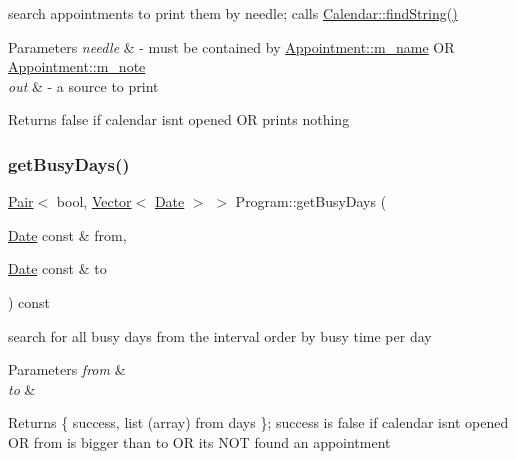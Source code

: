 search appointments to print them by needle; calls \hyperlink{classCalendar_accc025455e06e4031b9b76fe1a35220d}{Calendar\+::find\+String()} 
\begin{DoxyParams}{Parameters}
{\em needle} & -\/ must be contained by \hyperlink{classAppointment_aa3d8a2e3194a6b785b26f7c31a208462}{Appointment\+::m\+\_\+name} OR \hyperlink{classAppointment_a048a5e8081bcdccf2cffa725bcbe91b3}{Appointment\+::m\+\_\+note} \\
\hline
{\em out} & -\/ a source to print \\
\hline
\end{DoxyParams}
\begin{DoxyReturn}{Returns}
false if calendar isn\textquotesingle{}t opened OR prints nothing 
\end{DoxyReturn}
\mbox{\label{classProgram_af91512a81cffe079b6c300f47df906e8}} 
\subsubsection{\texorpdfstring{get\+Busy\+Days()}{getBusyDays()}}
{\footnotesize\ttfamily \hyperlink{structPair}{Pair}$<$ bool, \hyperlink{classVector}{Vector}$<$ \hyperlink{classDate}{Date} $>$ $>$ Program\+::get\+Busy\+Days (\begin{DoxyParamCaption}\item[{\hyperlink{classDate}{Date} const \&}]{from,  }\item[{\hyperlink{classDate}{Date} const \&}]{to }\end{DoxyParamCaption}) const}

search for all busy days from the interval order by busy time per day 
\begin{DoxyParams}{Parameters}
{\em from} & \\
\hline
{\em to} & \\
\hline
\end{DoxyParams}
\begin{DoxyReturn}{Returns}
\{ success, list (array) from days \}; success is false if calendar isn\textquotesingle{}t opened OR from is bigger than to OR it\textquotesingle{}s N\+OT found an appointment 
\end{DoxyReturn}
\mbox{\label{classProgram_a78c686e8f768666e0377b23317134b4a}} 
